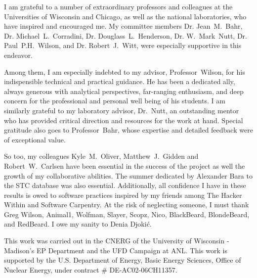 I am grateful to a number of extraordinary professors and colleagues at the 
Universities of Wisconsin and Chicago, as well as the national laboratories, 
who have inspired and encouraged me. My committee members Dr. Jean~M.~Bahr, Dr.  
Michael~L.~Corradini, Dr. Douglass~L.~Henderson, Dr. W.~Mark~Nutt, Dr.  
Paul~P.H.~Wilson, and Dr. Robert~J.~Witt, were especially supportive in this 
endeavor.  

Among them, I am especially indebted to my advisor, Professor~Wilson, 
for his indispensible technical and practical guidance. He has been a dedicated 
ally, always generous with analytical perspectives, far-ranging enthusiasm, 
and deep concern for the professional and personal well being of his 
students. I am similarly grateful to my laboratory advisor, Dr.~Nutt, an 
outstanding mentor who has provided critical direction and resources for the 
work at hand. Special gratitude also goes to Professor~Bahr, whose 
expertise and detailed feedback were of exceptional value.  

So too, my colleagues Kyle~M.~Oliver, Matthew~J.~Gidden and Robert~W.~Carlsen 
have been essential in the success of the \Cyclus project as well the growth of 
my collaborative abilities. The summer dedicated by Alexander Bara to the STC 
database was also essential. Additionally, all confidence I have in 
these results is owed to software practices inspired by my friends among The 
Hacker Within and Software Carpentry. At the risk of neglecting someone, I must 
thank Greg Wilson, Animal1, Wolfman, Slayer, Scopz, Nico,  BlackBeard, 
BlondeBeard, and RedBeard. I owe my sanity to Denia Djoki\'{c}.

This work was carried out in the \gls{CNERG} of the University of Wisconsin - 
Madison's \gls{EP} Department and the \gls{UFD} Campaign at \gls{ANL}. This 
work is supported by the U.S. Department of Energy, Basic Energy Sciences, 
Office of Nuclear Energy, under contract \# DE-AC02-06CH11357.
